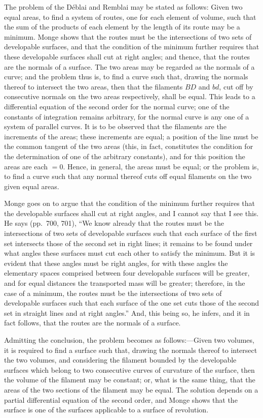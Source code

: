 \documentclass[11pt,a4paper]{article}
\theoremstyle{cayley}
\begin{document}
The problem of the D\'{e}blai and Remblai may be stated as follows: Given two equal areas, to find a system of routes, one for each element of volume, such that the sum of the products of each element by the length of its route may be a minimum. Monge shows that the routes must be the intersections of two sets of developable surfaces, and that the condition of the minimum further requires that these developable surfaces shall cut at right angles; and thence, that the routes are the normals of a surface. The two areas may be regarded as the normals of a curve; and the problem thus is, to find a curve such that, drawing the normals thereof to intersect the two areas, then that the filaments $BD$ and $bd$, cut off by consecutive normals on the two areas respectively, shall be equal. This leads to a differential equation of the second order for the normal curve; one of the constants of integration remains arbitrary, for the normal curve is any one of a system of parallel curves. It is to be observed that the filaments are the increments of the areas; these increments are equal; a position of the line must be the common tangent of the two areas (this, in fact, constitutes the condition for the determination of one of the arbitrary constants), and for this position the areas are each $=0$. Hence, in general, the areas must be equal; or the problem is, to find a curve such that any normal thereof cuts off equal filaments on the two given equal areas.

Monge goes on to argue that the condition of the minimum further requires that the developable surfaces shall cut at right angles, and I cannot say that I see this. He says (pp.~700, 701), ``We know already that the routes must be the intersections of two sets of developable surfaces such that each surface of the first set intersects those of the second set in right lines; it remains to be found under what angles these surfaces must cut each other to satisfy the minimum. But it is evident that these angles must be right angles, for with these angles the elementary spaces comprised between four developable surfaces will be greater, and for equal distances the transported mass will be greater; therefore, in the case of a minimum, the routes must be the intersections of two sets of developable surfaces such that each surface of the one set cuts those of the second set in straight lines and at right angles.'' And, this being so, he infers, and it in fact follows, that the routes are the normals of a surface.

Admitting the conclusion, the problem becomes as follows:---Given two volumes, it is required to find a surface such that, drawing the normals thereof to intersect the two volumes, and considering the filament bounded by the developable surfaces which belong to two consecutive curves of curvature of the surface, then the volume of the filament may be constant; or, what is the same thing, that the areas of the two sections of the filament may be equal. The solution depends on a partial differential equation of the second order, and Monge shows that the surface is one of the surfaces applicable to a surface of revolution.
\end{document}
